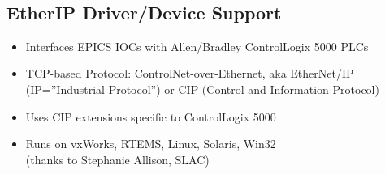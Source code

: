 \documentclass[letterpaper,landscape]{article}
\begin{document}
\sffamily

\begin{slide}
\title{}
\author{kasemir@lanl.gov}
\date{Nov.\ 2003}
\color{section1}
\maketitle
\vfill
~~
\end{slide}

\begin{slide}
\section{EtherIP Driver/Device Support}
\begin{itemize}
\item Interfaces EPICS IOCs with Allen/Bradley ControlLogix 5000 PLCs
\item TCP-based Protocol: ControlNet-over-Ethernet, aka EtherNet/IP
      (IP=''Industrial Protocol'') or CIP (Control and Information Protocol)
\item Uses CIP extensions specific to ControlLogix 5000
\item Runs on vxWorks, RTEMS, Linux, Solaris, Win32\\
      (thanks to Stephanie Allison, SLAC)
\end{itemize}
\vfill
~~
\end{slide}
\end{document}
